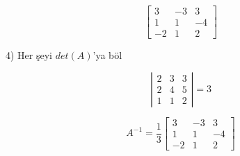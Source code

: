 \documentclass[12pt,fleqn]{article}\usepackage{../../common}
\begin{document}
$$
\left[\begin{array}{rrr}
3 & -3 & 3 \\
1 & 1 & -4 \\
-2 & 1 & 2
\end{array}\right]
$$

4) Her şeyi $det(A)$'ya böl

$$
\left|\begin{array}{rrr}
2 & 3 & 3 \\
2 & 4 & 5 \\
1 & 1 & 2
\end{array}\right| = 3
$$

$$ A^{-1} =
\frac{1}{3}
\left[\begin{array}{rrr}
3 & -3 & 3 \\
1 & 1 & -4 \\
-2 & 1 & 2
\end{array}\right]
$$
\end{document}
